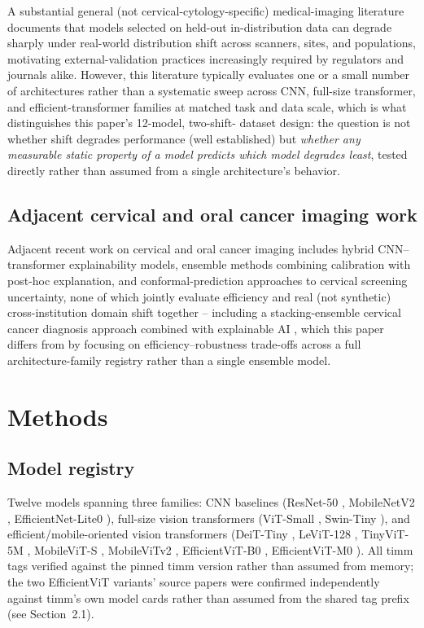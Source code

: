 \documentclass[runningheads]{llncs}
\begin{document}
A substantial general (not cervical-cytology-specific) medical-imaging
literature documents that models selected on held-out in-distribution
data can degrade sharply under real-world distribution shift across
scanners, sites, and populations, motivating external-validation
practices increasingly required by regulators and journals alike.
However, this literature typically evaluates one or a small number of
architectures rather than a systematic sweep across CNN, full-size
transformer, and efficient-transformer families at matched task and
data scale, which is what distinguishes this paper's 12-model, two-shift-
dataset design: the question is not whether shift degrades performance
(well established) but \emph{whether any measurable static property of a
model predicts which model degrades least}, tested directly rather than
assumed from a single architecture's behavior.

\subsection{Adjacent cervical and oral cancer imaging work}

Adjacent recent work on cervical and oral cancer imaging includes hybrid
CNN--transformer explainability models, ensemble methods combining
calibration with post-hoc explanation, and conformal-prediction
approaches to cervical screening uncertainty, none of which jointly
evaluate efficiency and real (not synthetic) cross-institution domain
shift together -- including a stacking-ensemble cervical cancer diagnosis
approach combined with explainable AI \cite{mohiuddin2025}, which this
paper differs from by focusing on efficiency--robustness trade-offs across
a full architecture-family registry rather than a single ensemble model.

\section{Methods}

\subsection{Model registry}

Twelve models spanning three families: CNN baselines (ResNet-50
\cite{he2016resnet}, MobileNetV2 \cite{sandler2018mobilenetv2},
EfficientNet-Lite0 \cite{tan2019efficientnet}), full-size vision
transformers (ViT-Small \cite{dosovitskiy2021vit}, Swin-Tiny
\cite{liu2021swin}), and efficient/mobile-oriented vision transformers
(DeiT-Tiny \cite{touvron2021deit}, LeViT-128 \cite{graham2021levit},
TinyViT-5M \cite{wu2022tinyvit}, MobileViT-S \cite{mehta2022mobilevit},
MobileViTv2 \cite{mehta2022mobilevitv2}, EfficientViT-B0
\cite{cai2023efficientvit}, EfficientViT-M0 \cite{liu2023efficientvit}).
All timm tags verified against the pinned timm version rather than assumed
from memory; the two EfficientViT variants' source papers were confirmed
independently against timm's own model cards rather than assumed from the
shared tag prefix (see Section~2.1).
\end{document}
